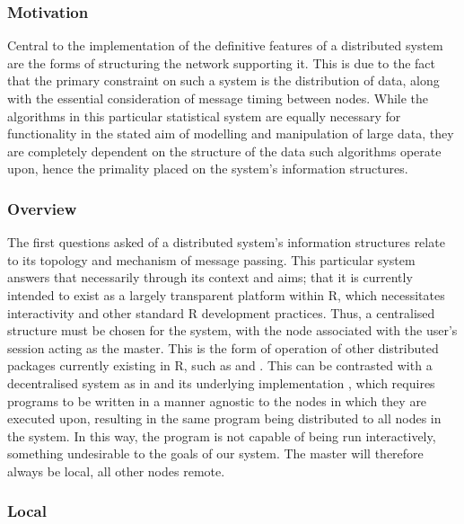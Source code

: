 \subsubsection{Motivation}\label{sec:topo-motivation}

Central to the implementation of the definitive features of a distributed system are the forms of structuring the network supporting it.
This is due to the fact that the primary constraint on such a system is the distribution of data, along with the essential consideration of message timing between nodes.
While the algorithms in this particular statistical system are equally necessary for functionality in the stated aim of modelling and manipulation of large data, they are completely dependent on the structure of the data such algorithms operate upon, hence the primality placed on the system's information structures.

\subsubsection{Overview}\label{overview}

The first questions asked of a distributed system's information structures relate to its topology and mechanism of message passing.
This particular system answers that necessarily through its context and aims; that it is currently intended to exist as a largely transparent platform within R, which necessitates interactivity and other standard R development practices.
Thus, a centralised structure must be chosen for the system, with the node associated with the user's \R{} session acting as the master.
This is the form of operation of other distributed packages currently existing in R, such as  and  \cites{luraschi20,tierney2018snow}.
This can be contrasted with a decentralised system as in  and its underlying  implementation \cite{pbdR2012}, which requires \R{} programs to be written in a manner agnostic to the nodes in which they are executed upon, resulting in the same program being distributed to all nodes in the system.
In this way, the program is not capable of being run interactively, something undesirable to the goals of our system.
The master will therefore always be local, all other nodes remote.

\subsubsection{Local}\label{local}

